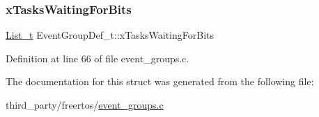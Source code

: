 \subsubsection{\texorpdfstring{x\+Tasks\+Waiting\+For\+Bits}{xTasksWaitingForBits}}
{\footnotesize\ttfamily \hyperlink{list_8h_afd590ef6400071b4d63d65ef90bea7f4}{List\+\_\+t} Event\+Group\+Def\+\_\+t\+::x\+Tasks\+Waiting\+For\+Bits}



Definition at line 66 of file event\+\_\+groups.\+c.



The documentation for this struct was generated from the following file\+:\begin{DoxyCompactItemize}
\item 
third\+\_\+party/freertos/\hyperlink{event__groups_8c}{event\+\_\+groups.\+c}\end{DoxyCompactItemize}
